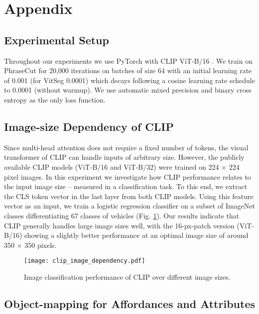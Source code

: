 \section*{Appendix}

\subsection*{Experimental Setup}

\label{sec:train_setup}

Throughout our experiments we use PyTorch \cite{pytorch} with CLIP ViT-B/16 \cite{radford20}. We train on PhraseCut \cite{wu20phrasecut} for 20,000 iterations on batches of size 64 with an initial learning rate of 0.001 (for VitSeg 0.0001) which decays following a cosine learning rate schedule to 0.0001 (without warmup). We use automatic mixed precision and binary cross entropy as the only loss function.

\subsection*{Image-size Dependency of CLIP}
Since multi-head attention does not require a fixed number of tokens, the visual transformer of CLIP can handle inputs of arbitrary size. However, the publicly available CLIP models (ViT-B/16 and ViT-B/32) were trained on 224 $\times$ 224 pixel images. In this experiment we investigate how CLIP performance relates to the input image size -- measured in a classification task.
To this end, we extract the CLS token vector in the last layer from both CLIP models. Using this feature vector as an input, we train a logistic regression classifier on a subset of ImageNet \cite{imagenet} classes differentiating 67 classes of vehicles (Fig. \ref{fig:image_size}).
Our results indicate that CLIP generally handles large image sizes well, with the 16-px-patch version (ViT-B/16) showing a slightly better performance at an optimal image size of around 350 $\times$ 350 pixels.

\begin{figure}[h]
    \centering
    \texttt{[image: clip\_image\_dependency.pdf]}
    \caption{Image classification performance of CLIP over different image sizes.}
    \label{fig:image_size}
\end{figure}

\subsection*{Object-mapping for Affordances and Attributes}
\label{sec:object_mapping}

